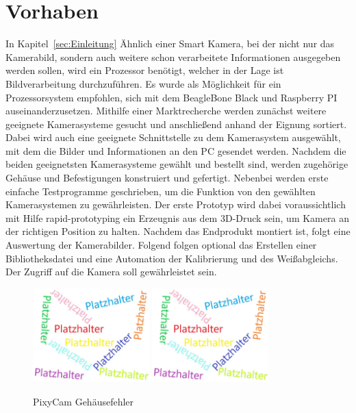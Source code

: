 \section{Vorhaben}
In Kapitel~\ref{sec:Einleitung} Ähnlich einer Smart Kamera, bei der nicht nur das Kamerabild, sondern auch weitere schon verarbeitete Informationen ausgegeben werden sollen, wird ein Prozessor benötigt, welcher in der Lage ist Bildverarbeitung durchzuführen. Es wurde als Möglichkeit für ein Prozessorsystem empfohlen, sich mit dem BeagleBone Black und Raspberry PI auseinanderzusetzen. Mithilfe einer Marktrecherche werden zunächst weitere geeignete Kamerasysteme gesucht und anschließend anhand der Eignung sortiert. Dabei wird auch eine geeignete Schnittstelle zu dem Kamerasystem ausgewählt, mit dem die Bilder und Informationen an den PC gesendet werden. Nachdem die beiden geeignetsten Kamerasysteme gewählt und bestellt sind, werden zugehörige Gehäuse und Befestigungen konstruiert und gefertigt. Nebenbei werden erste einfache Testprogramme geschrieben, um die Funktion von den gewählten Kamerasystemen zu gewährleisten. Der erste Prototyp wird dabei voraussichtlich mit Hilfe rapid-prototyping ein Erzeugnis aus dem 3D-Druck sein, um Kamera an der richtigen Position zu halten. Nachdem das Endprodukt montiert ist, folgt eine Auswertung der Kamerabilder. Folgend folgen optional das Erstellen einer Bibliotheksdatei und eine Automation der Kalibrierung und des Weißabgleichs. Der Zugriff auf die Kamera soll gewährleistet sein. 

\begin{figure}[htb]
    \centering
    \includegraphics[width=0.4\textwidth]{Abbildungen/Platzhalter.jpg}
    \includegraphics[width=0.4\textwidth]{Abbildungen/Platzhalter.jpg}
    \caption{PixyCam Gehäusefehler}		
    \label{fig:Pixy_Fehler}
\end{figure}

